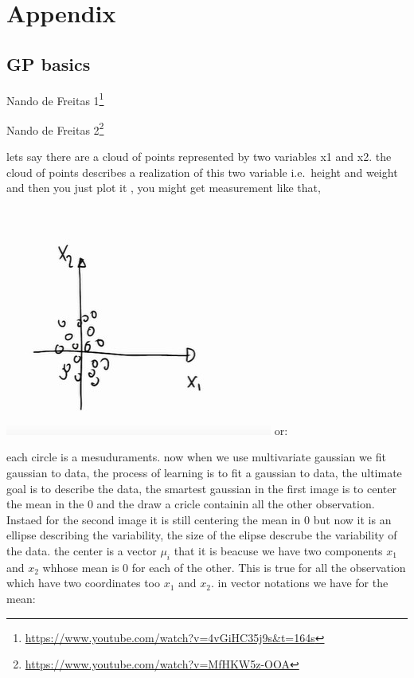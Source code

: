 \documentclass[
  12pt,
  a4paper,
  oneside]{book}
\DeclareRobustCommand{\href}[2]{#2\footnote{\url{#1}}}
\theoremstyle{definition}
\theoremstyle{definition}
\theoremstyle{definition}
\theoremstyle{remark}
\begin{document}
\hypertarget{appendix}{%
\chapter*{Appendix}\label{appendix}}

\hypertarget{gp-basics}{%
\section{GP basics}\label{gp-basics}}

\href{https://www.youtube.com/watch?v=4vGiHC35j9s\&t=164s}{Nando de Freitas 1}

\href{https://www.youtube.com/watch?v=MfHKW5z-OOA}{Nando de Freitas 2}

lets say there are a cloud of points represented by two variables x1 and x2. the cloud of points describes a realization of this two variable i.e.~height and weight and then you just plot it , you might get measurement like that,

\includegraphics{appendix_images/gp_base_1.jpg}
or:

each circle is a mesuduraments. now when we use multivariate gaussian we fit gaussian to data, the process of learning is to fit a gaussian to data, the ultimate goal is to describe the data, the smartest gaussian in the first image is to center the mean in the 0 and the draw a cricle containin all the other observation. Instaed for the second image it is still centering the mean in 0 but now it is an ellipse describing the variability, the size of the elipse descrube the variability of the data.
the center is a vector \(\mu_{i}\) that it is beacuse we have two components \(x_1\) and \(x_2\) whhose mean is 0 for each of the other. This is true for all the observation which have two coordinates too \(x_1\) and \(x_2\). in vector notations we have for the mean:
\end{document}

